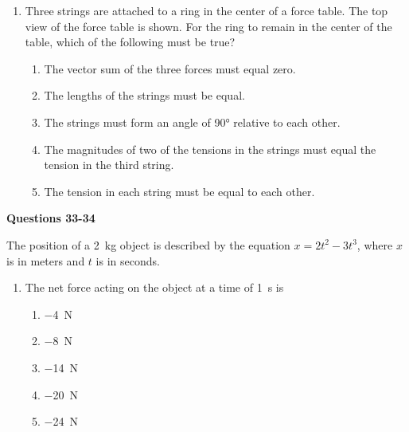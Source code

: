 \documentclass{../../oss-apphys}
\begin{document}
\begin{multicols}{2}
\begin{enumerate}[resume,leftmargin=18pt]


  \item Three strings are attached to a ring in the center of a force table. The
    top view of the force table is shown. For the ring to remain in the
    center of the table, which of the following must be true?
    \begin{enumerate}[noitemsep,topsep=0pt,leftmargin=18pt,label=(\Alph*)]
    \item The vector sum of the three forces must equal zero.
    \item The lengths of the strings must be equal.
    \item The strings must form an angle of \ang{90} relative to each other.
    \item The magnitudes of two of the tensions in the strings must equal the
      tension in the third string.
    \item The tension in each string must be equal to each other.
    \end{enumerate}
  \end{enumerate}
  
  \textbf{Questions 33-34}

  The position of a \SI{2}{\kilo\gram} object is described by the equation
  $x=2t^2-3t^3$, where $x$ is in meters and $t$ is in seconds.
  \begin{enumerate}[resume,leftmargin=18pt]
  \item The net force acting on the object at a time of \SI{1}{s} is
    \begin{enumerate}[noitemsep,topsep=0pt,leftmargin=18pt,label=(\Alph*)]
    \item\SI{-4}{\newton}
    \item\SI{-8}{\newton}
    \item\SI{-14}{\newton}
    \item\SI{-20}{\newton}
    \item\SI{-24}{\newton}
    \end{enumerate}


\end{enumerate}
\end{multicols}
\end{document}
